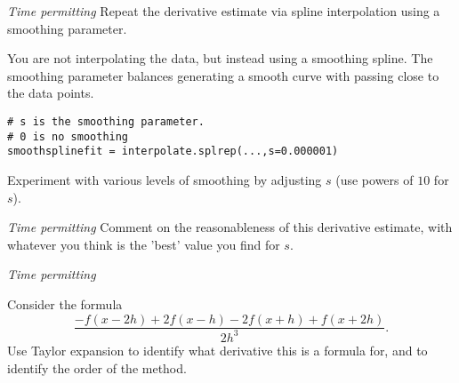 \documentclass[12pt,letterpaper,noanswers]{exam}
\begin{document}
\begin{questions}
\begin{parts}


\item \emph{Time permitting}  Repeat the derivative estimate via spline interpolation using a smoothing parameter.

You are not interpolating the data, but instead using a smoothing spline.  The smoothing parameter balances generating a smooth curve with passing close to the data points.

\begin{verbatim}
# s is the smoothing parameter.
# 0 is no smoothing
smoothsplinefit = interpolate.splrep(...,s=0.000001)
\end{verbatim}

Experiment with various levels of smoothing by adjusting $s$ (use powers of $10$ for $s$).

\item \emph{Time permitting} Comment on the reasonableness of this derivative estimate, with whatever you think is the 'best' value you find for $s$.

\end{parts}


\question \emph{Time permitting} 

Consider the formula \[\frac{-f(x-2h) + 2f(x-h) -2f(x+h) + f(x+2h)}{2h^3}.\]  Use Taylor expansion to identify what derivative this is a formula for, and to identify the order of the method.


\end{questions}
\end{document}
